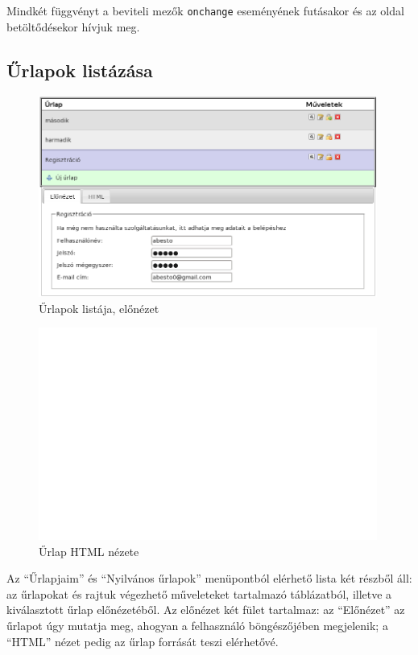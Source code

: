 \documentclass[12pt,a4paper,twoside]{article}
\begin{document}
Mindkét függvényt a beviteli mezők \texttt{onchange} eseményének futásakor és az
oldal betöltődésekor hívjuk meg.


\clearpage
{}
\subsection{Űrlapok listázása}

\begin{figure}[H]
\centering
  \includegraphics[width=420px]{form_list.png}
  \caption{Űrlapok listája, előnézet}
\end{figure}
\begin{figure}[H]
  \includegraphics[width=420px]{form_list_html.png}
  \caption{Űrlap HTML nézete}
\end{figure}
\clearpage

Az ``Űrlapjaim'' és ``Nyilvános űrlapok'' menüpontból elérhető lista két részből
áll: az űrlapokat  és rajtuk végezhető műveleteket tartalmazó táblázatból,
illetve a kiválasztott űrlap előnézetéből. Az előnézet két fület tartalmaz: az
``Előnézet'' az űrlapot úgy mutatja meg, ahogyan a felhasználó böngészőjében
megjelenik; a ``HTML'' nézet pedig az űrlap forrását teszi elérhetővé.
\end{document}
